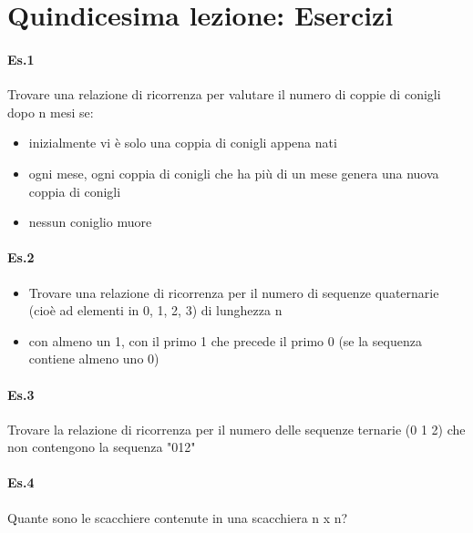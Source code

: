 \section{Quindicesima lezione: Esercizi}

\paragraph{Es.1} %
Trovare una relazione di ricorrenza per valutare il numero di coppie di conigli dopo n mesi
se:
\begin{itemize}
    \item inizialmente vi è solo una coppia di conigli appena nati
    \item ogni mese, ogni coppia di conigli che ha più di un mese genera una nuova coppia di
conigli
    \item nessun coniglio muore
\end{itemize}

\paragraph{Es.2} %
\begin{itemize}
    \item Trovare una relazione di ricorrenza per il numero di sequenze quaternarie (cioè ad elementi in {0, 1, 2, 3}) di lunghezza n
     \item con almeno un 1, con il primo 1 che precede il primo 0 (se la sequenza contiene almeno uno 0)
\end{itemize}    

\paragraph{Es.3} Trovare la relazione di ricorrenza per il numero delle sequenze ternarie
(0 1 2) che non contengono la sequenza "012"

\paragraph{Es.4} Quante sono le scacchiere contenute in una scacchiera n x n?


\newpage